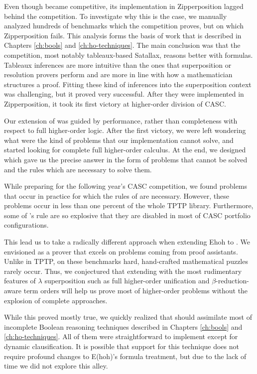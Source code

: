 Even though \lsup{} became competitive, its implementation in Zipperposition
lagged behind the competition. To investigate why this is the case,
we manually analyzed hundreds of benchmarks which the competition proves, but
on which Zipperposition fails. This analysis forms the basis of work that is
described in Chapters \ref{ch:bools} and \ref{ch:ho-techniques}. The main
conclusion was that the competition, most notably tableaux-based Satallax,
reasons better with formulas. Tableaux inferences are more intuitive than the
ones that superposition or resolution provers perform and are more in line with
how a mathematician structures a proof. Fitting these kind of
inferences into the superposition context was challenging, but it proved very
successful. After they were implemented in Zipperposition, it took its first
victory at higher-order division of CASC.

Our extension of \lsup{} was guided by performance, rather than completeness
with respect to full higher-order logic. After the first victory, we were left
wondering what were the kind of problems that our implementation cannot
solve, and started looking for complete full higher-order calculus. At the end,
we designed \osup{} which gave us the precise answer in the form of problems that
cannot be solved and the rules which are necessary to solve them. 

While preparing for the following year's CASC competition, we found problems
that occur in practice for which the rules of \osup{} are necessary. However,
these problems occur in less than one percent of the whole TPTP library.
Furthermore, some of \osup{}'s rule are so explosive that they are disabled in
most of CASC portfolio configurations.

This lead us to take a radically different approach when extending Ehoh to
\ehohii{}. We envisioned \ehohii{} as a prover that excels on problems coming
from proof assistants. Unlike in TPTP, on these benchmarks hard, hand-crafted mathematical puzzles rarely occur.
Thus, we conjectured that extending \lfsup{} with the most rudimentary features
of $\lambda$ superposition such as full higher-order unification and
$\beta$-reduction-aware term orders will help us prove most of higher-order
problems without the explosion of complete approaches.

While this proved mostly true, we quickly realized that \ehohii{} should
assimilate most of incomplete Boolean reasoning techniques described in Chapters
\ref{ch:bools} and \ref{ch:ho-techniques}. All of them were straightforward to
implement except for dynamic clausification. It is possible that support for
this technique does not require profound changes to E(hoh)'s formula treatment,
but due to the lack of time we did not explore this alley.


